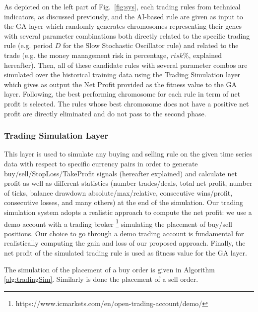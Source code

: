 As depicted on the left part of Fig.~\ref{fig:sys}, each trading rules from technical indicators, as discussed previously, and the AI-based rule are given as input to the GA layer which randomly generates chromosomes representing their genes with several parameter combinations both directly related to the specific trading rule (e.g. period $D$ for the Slow Stochastic Oscillator rule) and related to the trade (e.g. the money management risk in percentage, $risk\%$, explained hereafter). Then, all of these candidate rules with several parameter combos are simulated over the historical training data using the Trading Simulation layer which gives as output the Net Profit provided as the fitness value to the GA layer. Following, the best performing chromosome for each rule in term of net profit is selected. 
The rules whose best chromosome does not have a positive net profit are directly eliminated and do not pass to the second phase.


\subsubsection{Trading Simulation Layer}
\label{subsection:trading}
This layer is used to simulate any buying and selling rule on the given time series data with respect to specific currency pairs in order to generate buy/sell/StopLoss/TakeProfit signals (hereafter explained) and calculate net profit as well as different statistics (number trades/deals, total net profit, number of ticks, balance drawdown absolute/max/relative, consecutive wins/profit, consecutive losses, and many others) at the end of the simulation. Our trading simulation system adopts a realistic approach to compute the net profit: we use a demo account with a trading broker \footnote{https://www.icmarkets.com/en/open-trading-account/demo/} simulating the placement of buy/sell positions. Our choice to go through a demo trading account is fundamental for realistically computing the gain and loss of our proposed approach. Finally, the net profit of the simulated trading rule is used as fitness value for the GA layer. 

The simulation of the placement of a buy order is given in Algorithm \ref{alg:tradingSim}. Similarly is done the placement of a sell order.

